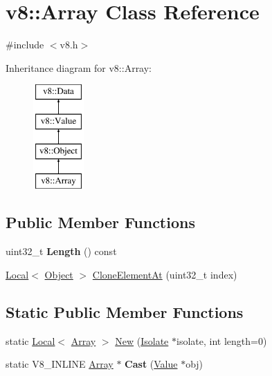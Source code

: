 \hypertarget{classv8_1_1Array}{\section{v8\-:\-:Array Class Reference}
\label{classv8_1_1Array}
}


{\ttfamily \#include $<$v8.\-h$>$}

Inheritance diagram for v8\-:\-:Array\-:\begin{figure}[H]
\begin{center}
\leavevmode
\includegraphics[height=4.000000cm]{classv8_1_1Array}
\end{center}
\end{figure}
\subsection*{Public Member Functions}
\begin{DoxyCompactItemize}
\item 
\hypertarget{classv8_1_1Array_a3c47dfd8d26e60ed4fcdc683034d6d9c}{uint32\-\_\-t {\bfseries Length} () const }\label{classv8_1_1Array_a3c47dfd8d26e60ed4fcdc683034d6d9c}

\item 
\hyperlink{classv8_1_1Local}{Local}$<$ \hyperlink{classv8_1_1Object}{Object} $>$ \hyperlink{classv8_1_1Array_a7335096a5349ce75b38d5b24af4bd125}{Clone\-Element\-At} (uint32\-\_\-t index)
\end{DoxyCompactItemize}
\subsection*{Static Public Member Functions}
\begin{DoxyCompactItemize}
\item 
static \hyperlink{classv8_1_1Local}{Local}$<$ \hyperlink{classv8_1_1Array}{Array} $>$ \hyperlink{classv8_1_1Array_a892f18fe6a25dfc0bc7b435759a30226}{New} (\hyperlink{classv8_1_1Isolate}{Isolate} $\ast$isolate, int length=0)
\item 
\hypertarget{classv8_1_1Array_ae56792766f8513395c3ebe8c29afde4b}{static V8\-\_\-\-I\-N\-L\-I\-N\-E \hyperlink{classv8_1_1Array}{Array} $\ast$ {\bfseries Cast} (\hyperlink{classv8_1_1Value}{Value} $\ast$obj)}\label{classv8_1_1Array_ae56792766f8513395c3ebe8c29afde4b}

\end{DoxyCompactItemize}


